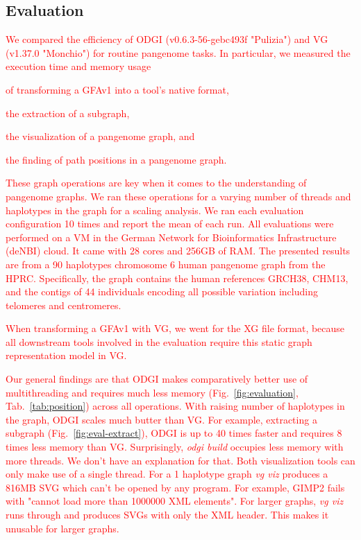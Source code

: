 \documentclass{bioinfo}
\newcommand{\REVIEWED}[1]{{\textcolor{Red}{#1}}}
\begin{document}
\subsection{Evaluation}
\label{Evaluation}

\REVIEWED{We compared the efficiency of ODGI (v0.6.3-56-gebc493f "Pulizia") and VG (v1.37.0 "Monchio") for routine pangenome tasks. In particular, we measured the execution time and memory usage}
\begin{inparaenum}[(i)]
	\item \REVIEWED{of transforming a GFAv1 into a tool's native format, }
	\item \REVIEWED{the extraction of a subgraph,}
	\item \REVIEWED{the visualization of a pangenome graph, and}
	\item \REVIEWED{the finding of path positions in a pangenome graph.}
\end{inparaenum}
\REVIEWED{These graph operations are key when it comes to the understanding of pangenome graphs. We ran these operations for a varying number of threads and haplotypes in the graph for a scaling analysis. We ran each evaluation configuration 10 times and report the mean of each run.
All evaluations were performed on a VM in the German Network for Bioinformatics Infrastructure (deNBI) cloud. It came with 28 cores and 256GB of RAM.
The presented results are from a 90 haplotypes chromosome 6 human pangenome graph from the HPRC. Specifically, the graph contains the human references GRCH38, CHM13, and the contigs of 44 individuals encoding all possible variation including telomeres and centromeres. }

\REVIEWED{When transforming a GFAv1 with VG, we went for the XG file format, because all downstream tools involved in the evaluation require this static graph representation model in VG.}

\REVIEWED{Our general findings are that ODGI makes comparatively better use of multithreading and requires much less memory (Fig.~\ref{fig:evaluation}, Tab.~\ref{tab:position}) across all operations. With raising number of haplotypes in the graph, ODGI scales much butter than VG. For example, extracting a subgraph (Fig.~\ref{fig:eval-extract}), ODGI is up to 40 times faster and requires 8 times less memory than VG. Surprisingly, \textit{odgi build} occupies less memory with more threads. We don't have an explanation for that.
}
\REVIEWED{Both visualization tools can only make use of a single thread. For a 1 haplotype graph \textit{vg viz} produces a 816MB SVG which can't be opened by any program. For example, GIMP2 fails with "cannot load more than 1000000 XML elements". For larger graphs, \textit{vg viz} runs through and produces SVGs with only the XML header. This makes it unusable for larger graphs.}
\end{document}
